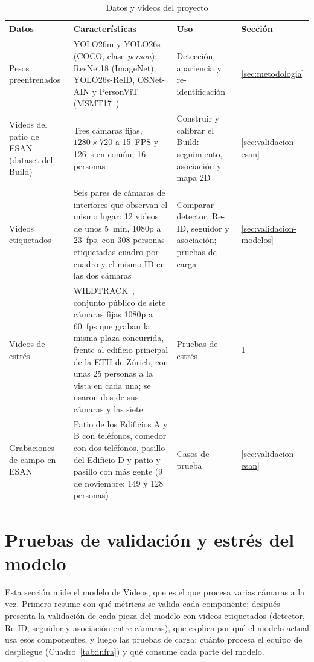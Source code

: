 \documentclass[12pt,a4paper]{article}
\begin{document}
\begin{table}[H]
\caption{Datos y videos del proyecto}
\label{tab:dataset}
\centering
\footnotesize
\renewcommand{\arraystretch}{1.15}
\begin{tabular}{|L{0.17\textwidth}|L{0.41\textwidth}|L{0.21\textwidth}|L{0.09\textwidth}|}
\hline
\textbf{Datos} & \textbf{Características} & \textbf{Uso} & \textbf{Sección} \\
\hline
Pesos preentrenados & YOLO26m y YOLO26s (COCO, clase \textit{person}); ResNet18 (ImageNet); YOLO26s-ReID, OSNet-AIN y PersonViT (MSMT17~\cite{wei2018}) & Detección, apariencia y re-identificación & \ref{sec:metodologia} \\
\hline
Videos del patio de ESAN (dataset del Build) & Tres cámaras fijas, $1280\times720$ a 15~FPS y 126~s en común; 16 personas & Construir y calibrar el Build: seguimiento, asociación y mapa 2D & \ref{sec:validacion-esan} \\
\hline
Videos etiquetados & Seis pares de cámaras de interiores que observan el mismo lugar: 12 videos de unos 5~min, 1080p a 23~fps, con 308 personas etiquetadas cuadro por cuadro y el mismo ID en las dos cámaras & Comparar detector, Re-ID, seguidor y asociación; pruebas de carga & \ref{sec:validacion-modelos} \\
\hline
Videos de estrés & WILDTRACK~\cite{chavdarova2018}, conjunto público de siete cámaras fijas 1080p a 60~fps que graban la misma plaza concurrida, frente al edificio principal de la ETH de Zúrich, con unas 25 personas a la vista en cada una; se usaron dos de sus cámaras y las siete & Pruebas de estrés & \ref{sec:pruebas} \\
\hline
Grabaciones de campo en ESAN & Patio de los Edificios A y B con teléfonos, comedor con dos teléfonos, pasillo del Edificio D y patio y pasillo con más gente (9 de noviembre: 149 y 128 personas) & Casos de prueba & \ref{sec:validacion-esan} \\
\hline
\end{tabular}
\end{table}

\FloatBarrier

\section{Pruebas de validación y estrés del modelo}
\label{sec:pruebas}

Esta sección mide el modelo de Videos, que es el que procesa varias cámaras a
la vez. Primero resume con qué métricas se valida cada componente; después
presenta la validación de cada pieza del modelo con videos
etiquetados (detector, Re-ID, seguidor y asociación entre cámaras), que
explica por qué el modelo actual usa esos componentes, y luego las pruebas de
carga: cuánto procesa el equipo de despliegue (Cuadro~\ref{tab:infra}) y qué
consume cada parte del modelo.
\end{document}
